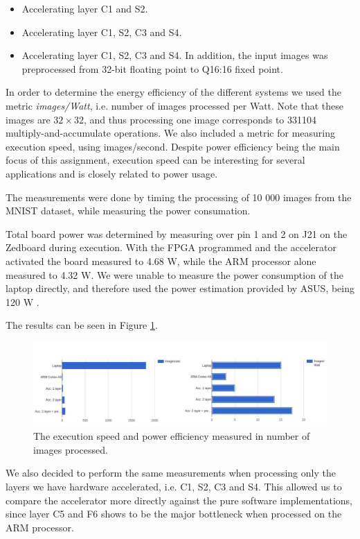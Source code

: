 \begin{itemize}
	\item Accelerating layer C1 and S2. 
	\item Accelerating layer C1, S2, C3 and S4.
	\item Accelerating layer C1, S2, C3 and S4. In addition, the input images was preprocessed from 32-bit floating point to Q16:16 fixed point. 
\end{itemize}

In order to determine the energy efficiency of the different systems we used the metric \textit{images/Watt}, i.e. number of images processed per Watt. Note that these images are $ 32 \times 32 $, and thus processing one image corresponds to 331104 multiply-and-accumulate operations. We also included a metric for measuring execution speed, using images/second. Despite power efficiency being the main focus of this assignment, execution speed can be interesting for several applications and is closely related to power usage. 

The measurements were done by timing the processing of 10 000 images from the MNIST dataset, while measuring the power consumation. 

Total board power was determined by measuring over pin 1 and 2 on J21 on the Zedboard during execution. With the FPGA programmed and the accelerator activated the board measured to 4.68 W, while the ARM processor alone measured to 4.32 W. We were unable to measure the power consumption of the laptop directly, and therefore used the power estimation provided by ASUS, being 120 W \cite{ASUS}.  

The results can be seen in Figure \ref{fig_results_all_layers}.

\begin{figure}[h!]
	\centering
	\includegraphics[width=1.0\textwidth]{Figures/Results/results_all_layers}
	\caption{The execution speed and power efficiency measured in number of images processed.}
	\label{fig_results_all_layers}
\end{figure}

We also decided to perform the same measurements when processing only the layers we have hardware accelerated, i.e. C1, S2, C3 and S4. This allowed us to compare the accelerator more directly against the pure software implementations, since layer C5 and F6 shows to be the major bottleneck when processed on the ARM processor. 

